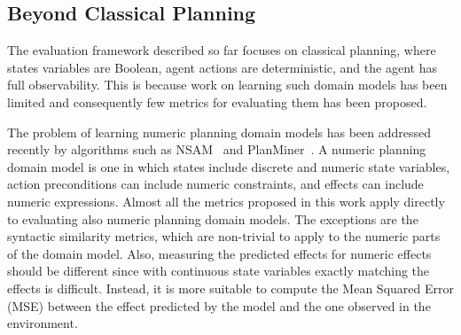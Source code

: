 \documentclass[letterpaper]{article} %
\begin{document}
\subsection{Beyond Classical Planning}
The evaluation framework described so far focuses on classical planning, where states variables are Boolean, 
agent actions are deterministic, 
and the agent has full observability. 
This is because work on learning such domain models has been limited and consequently few metrics for evaluating them has been proposed. 


The problem of learning numeric planning domain models has been addressed  
recently by algorithms such as NSAM~\cite{mordoch2023learning} and PlanMiner~\cite{segura2021discovering}. 
A numeric planning domain model is one in which states include discrete and numeric state variables, action preconditions can include numeric constraints, and effects can include numeric expressions. 
Almost all the metrics proposed in this work apply directly to evaluating also numeric planning domain models. 
The exceptions are the syntactic similarity metrics, which are non-trivial to apply to the numeric parts of the domain model. 
Also, measuring the predicted effects for numeric effects should be different since with continuous state variables exactly matching the effects is difficult. Instead, it is more suitable to compute the Mean Squared Error (MSE) between the effect predicted by the model and the one observed in the environment.   













\end{document}
